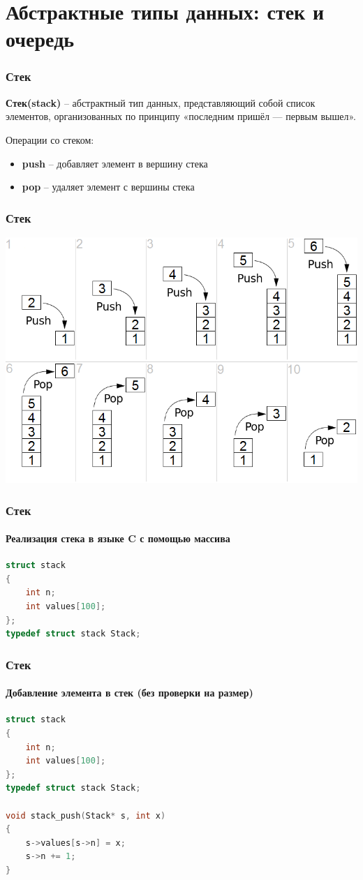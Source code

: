 \documentclass[12pt,pdf,hyperref={unicode}]{beamer}
\begin{document}
\section{Абстрактные типы данных: стек и очередь}

\begin{frame}[fragile]
\frametitle{Стек} 
\textbf{Стек(stack)} -- абстрактный тип данных, представляющий собой список элементов, организованных по принципу «последним пришёл — первым вышел». 

Операции со стеком:
\begin{itemize}
\item \textbf{push} -- добавляет элемент в вершину стека
\item \textbf{pop} -- удаляет элемент с вершины стека
\end{itemize}
\end{frame}


\begin{frame}[fragile]
\frametitle{Стек} 
\begin{center}
\includegraphics[width=0.8\linewidth]{images/Lifo_stack.png}
\end{center}
\end{frame}


\begin{frame}[fragile]
\frametitle{Стек} 
\framesubtitle{Реализация стека в языке C с помощью массива} 

\begin{lstlisting}[language=C++,basicstyle=\ttfamily,keywordstyle=\color{blue}]
struct stack 
{
    int n;
    int values[100];
};
typedef struct stack Stack;
\end{lstlisting}
\end{frame}


\begin{frame}[fragile]
\frametitle{Стек} 
\framesubtitle{Добавление элемента в стек (без проверки на размер)} 
\begin{lstlisting}[language=C++,basicstyle=\ttfamily,keywordstyle=\color{blue}]
struct stack 
{
    int n;
    int values[100];
};
typedef struct stack Stack;

void stack_push(Stack* s, int x)
{
    s->values[s->n] = x;
    s->n += 1;
}
\end{lstlisting}
\end{frame}
\end{document}
